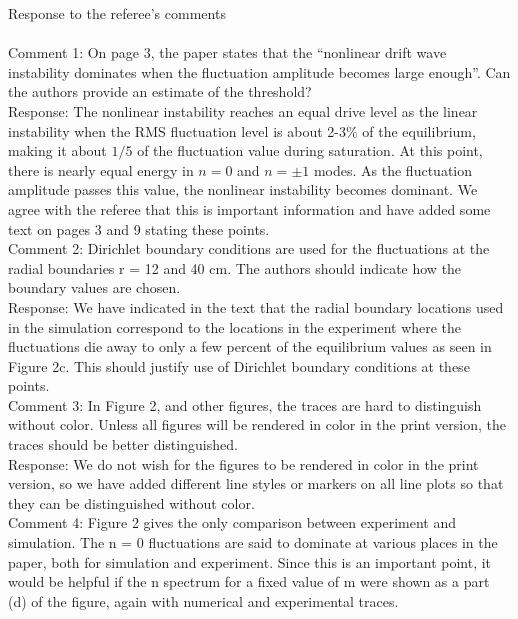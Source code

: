 \documentclass[12pt]{article}
\begin{document}
Response to the referee's comments \\ \\ 

Comment 1:   On page 3, the paper states that the “nonlinear drift wave instability dominates when
the fluctuation amplitude becomes large enough”. Can the authors provide an estimate of the threshold? \\

Response: The nonlinear instability reaches an equal drive level as the linear instability when the RMS fluctuation level is about 2-3$\%$ of the equilibrium, making it about $1/5$ 
of the fluctuation value during saturation. At this point, there is nearly equal energy in $n=0$ and $n= \pm 1$ modes. 
As the fluctuation amplitude passes this value, the nonlinear instability becomes dominant. We agree with the referee that this is important information and
have added some text on pages 3 and 9 stating these points. \\


Comment 2:    Dirichlet boundary conditions are used for the fluctuations at the radial boundaries r = 12 and 40 cm. The authors should indicate how the boundary values are chosen. \\

Response: We have indicated in the text that the radial boundary locations used in the simulation correspond to the locations in the experiment where the fluctuations die away to only
a few percent of the equilibrium values as seen in Figure 2c. This should justify use of Dirichlet boundary conditions at these points. \\

Comment 3:  In Figure 2, and other figures, the traces are hard to distinguish without color. Unless all figures will be rendered in color in the print version, the traces should be better
distinguished. \\

Response: We do not wish for the figures to be rendered in color in the print version, so we have added different line styles or markers on all line plots so that they can be 
distinguished without color. \\

Comment 4:   Figure 2 gives the only comparison between experiment and simulation. The n = 0
fluctuations are said to dominate at various places in the paper, both for simulation and
experiment. Since this is an important point, it would be helpful if the n spectrum for a
fixed value of m were shown as a part (d) of the figure, again with numerical and
experimental traces. \\
\end{document}
